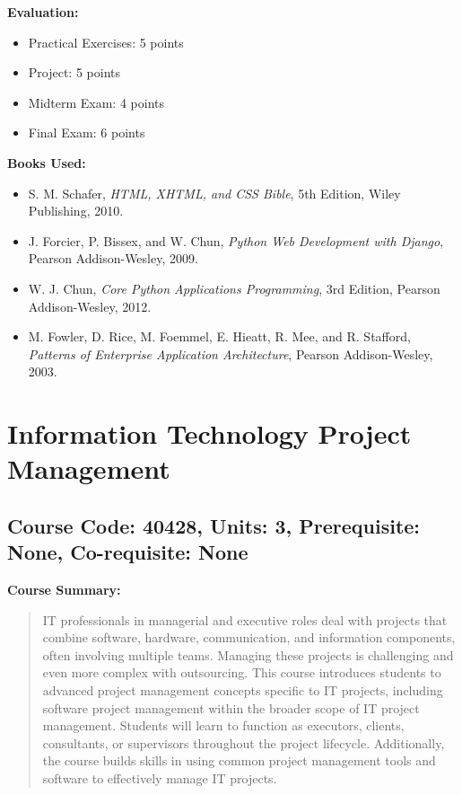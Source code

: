 \documentclass[12pt]{article}
\begin{document}
\textbf{Evaluation:}
\begin{itemize}
    \item Practical Exercises: 5 points
    \item Project: 5 points
    \item Midterm Exam: 4 points
    \item Final Exam: 6 points
\end{itemize}

\textbf{Books Used:}
\begin{itemize}
    \item S. M. Schafer, \textit{HTML, XHTML, and CSS Bible}, 5th Edition, Wiley Publishing, 2010.
    \item J. Forcier, P. Bissex, and W. Chun, \textit{Python Web Development with Django}, Pearson Addison-Wesley, 2009.
    \item W. J. Chun, \textit{Core Python Applications Programming}, 3rd Edition, Pearson Addison-Wesley, 2012.
    \item M. Fowler, D. Rice, M. Foemmel, E. Hieatt, R. Mee, and R. Stafford, \textit{Patterns of Enterprise Application Architecture}, Pearson Addison-Wesley, 2003.
\end{itemize}

\newpage

\section{Information Technology Project Management}
\subsection*{Course Code: 40428, Units: 3, Prerequisite: None, Co-requisite: None}

\textbf{Course Summary:}
\begin{quote}
IT professionals in managerial and executive roles deal with projects that combine software, hardware, communication, and information components, often involving multiple teams. Managing these projects is challenging and even more complex with outsourcing. This course introduces students to advanced project management concepts specific to IT projects, including software project management within the broader scope of IT project management. Students will learn to function as executors, clients, consultants, or supervisors throughout the project lifecycle. Additionally, the course builds skills in using common project management tools and software to effectively manage IT projects.
\end{quote}
\end{document}
